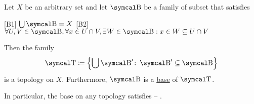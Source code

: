 \begin{proposition}\label{thm:topological_base_axioms}\cite[12]{Engelking1989}
  Let \( X \) be an arbitrary set and let \( \CB \) be a family of subset that satisfies
  \begin{description}
    [B1] \( \bigcup \CB = X \)
    [B2] \( \forall U, V \in \CB, \forall x \in U \cap V, \exists W \in \CB: x \in W \subseteq U \cap V \)
  \end{description}

  Then the family
  \begin{align}\label{thm:topological_base_axioms/topology}
    \CT \coloneqq \left\{ \bigcup \CB' \colon \CB' \subseteq \CB \right\}
  \end{align}
  is a topology on \( X \). Furthermore, \( \CB \) is a \hyperref[def:topological_base]{base} of \( \CT \).

  In particular, the base on any topology satisfies  -- .
\end{proposition}

